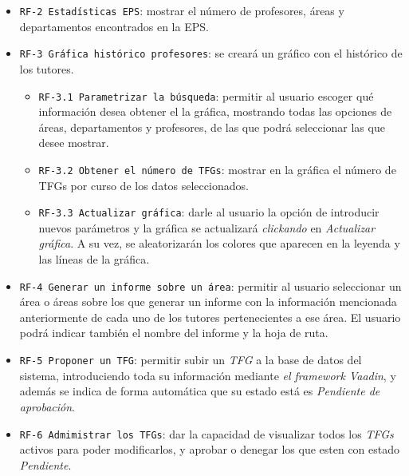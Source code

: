 \begin{itemize}
\begin{itemize}
		\end{itemize}
		\item \texttt{RF-2  Estadísticas EPS}: mostrar el número de profesores, áreas y departamentos encontrados en la EPS.
		\item \texttt{RF-3 Gráfica histórico profesores}: se creará un gráfico con el histórico de los tutores.
		\begin{itemize}
			\item \texttt{RF-3.1 Parametrizar la búsqueda}: permitir al usuario escoger qué información desea obtener el la gráfica, mostrando todas las opciones de áreas, departamentos y profesores, de las que podrá seleccionar las que desee mostrar.
			\item \texttt{RF-3.2 Obtener el número de TFGs}: mostrar en la gráfica el número de TFGs por curso de los datos seleccionados.
			\item \texttt{RF-3.3 Actualizar gráfica}: darle al usuario la opción de introducir nuevos parámetros y la gráfica se actualizará \emph{clickando} en \emph{Actualizar gráfica}. A su vez, se aleatorizarán los colores que aparecen en la leyenda y las líneas de la gráfica.
		\end{itemize}
		\item \texttt{RF-4 Generar un informe sobre un área}: permitir al usuario seleccionar un área o áreas sobre los que generar un informe con la información  mencionada anteriormente de cada uno de los tutores pertenecientes a ese área. El usuario podrá indicar también el nombre del informe y la hoja de ruta.
		\item \texttt{RF-5 Proponer un TFG}: permitir subir un \emph{TFG} a la base de datos del sistema, introduciendo toda su información mediante \emph{el framework Vaadin}, y además se indica de forma automática que su estado está es \emph{Pendiente de aprobación}.
		\item \texttt{RF-6 Admimistrar los TFGs}: dar la capacidad de visualizar todos los \emph{TFGs} activos para poder modificarlos, y aprobar o denegar los que esten con estado \emph{Pendiente}.
		
\end{itemize}

